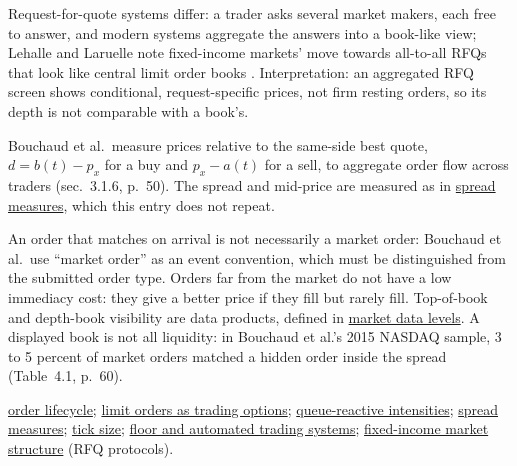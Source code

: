 \begin{qfdefinition}
Request-for-quote systems differ: a trader asks several market makers, each free to answer, and modern systems aggregate the answers into a book-like view; Lehalle and Laruelle note fixed-income markets' move towards all-to-all RFQs that look like central limit order books \citep[chap.~3, p.~216]{alpha-laruelle}. Interpretation: an aggregated RFQ screen shows conditional, request-specific prices, not firm resting orders, so its depth is not comparable with a book's.

 Bouchaud et al.\ measure prices relative to the same-side best quote, $d=b(t)-p_x$ for a buy and $p_x-a(t)$ for a sell, to aggregate order flow across traders (sec.~3.1.6, p.~50). The spread and mid-price are measured as in \hyperref[def:spread-measures]{spread measures}, which this entry does not repeat.

 An order that matches on arrival is not necessarily a market order: Bouchaud et al.\ use ``market order'' as an event convention, which must be distinguished from the submitted order type. Orders far from the market do not have a low immediacy cost: they give a better price if they fill but rarely fill. Top-of-book and depth-book visibility are data products, defined in \hyperref[data:market-data-levels]{market data levels}. A displayed book is not all liquidity: in Bouchaud et al.'s 2015 NASDAQ sample, 3 to 5 percent of market orders matched a hidden order inside the spread (Table~4.1, p.~60).

 \hyperref[mech:order-lifecycle]{order lifecycle}; \hyperref[res:limit-order-options]{limit orders as trading options}; \hyperref[mod:queue-reactive-intensities]{queue-reactive intensities}; \hyperref[def:spread-measures]{spread measures}; \hyperref[def:tick-size]{tick size}; \hyperref[def:floor-automated-trading-systems]{floor and automated trading systems}; \hyperref[def:fixed-income-market-structure]{fixed-income market structure} (RFQ protocols).

\end{qfdefinition}

